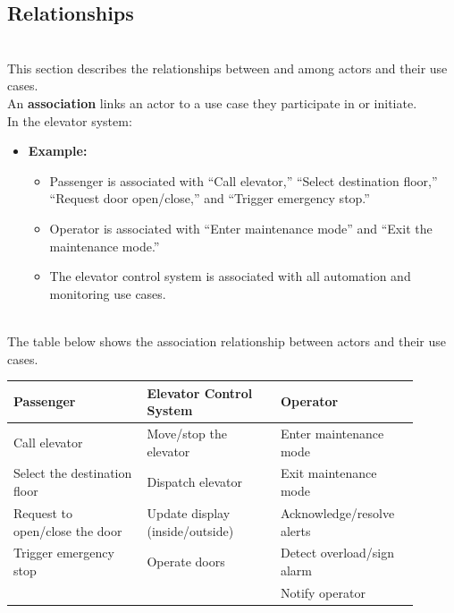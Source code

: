 \subsection{Relationships}\label{vaS9mo3iPRphPADvreLsY}
\\
This section describes the relationships between and among actors and their use cases.
\\
An \textbf{association} links an actor to a use case they participate in or initiate.
\\
In the elevator system:

\begin{itemize}
\item
\protect{}\label{wcYV5BUJduszc28h0k-aZ}
\textbf{Example:}

\begin{itemize}
\item
Passenger is associated with ``Call elevator,'' ``Select destination floor,'' ``Request door open/close,'' and ``Trigger emergency stop.''
\item
Operator is associated with ``Enter maintenance mode'' and ``Exit the maintenance mode.''
\item
The elevator control system is associated with all automation and monitoring use cases.
\end{itemize}
\end{itemize}
\\
The table below shows the association relationship between actors and their use cases.

\begin{center}
\begin{tabular}{|p{0.3\linewidth}|p{0.3\linewidth}|p{0.3\linewidth}|}
\hline
\textbf{Passenger} & \textbf{Elevator Control System} & \textbf{Operator} \\
\hline
Call elevator & Move/stop the elevator & Enter maintenance mode \\
\hline
Select the destination floor & Dispatch elevator & Exit maintenance mode \\
\hline
Request to open/close the door & Update display (inside/outside) & Acknowledge/resolve alerts \\
\hline
Trigger emergency stop & Operate doors & Detect overload/sign alarm \\
\hline
 &  & Notify operator \\
\hline
\end{tabular}
\end{center}



